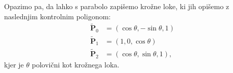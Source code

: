\documentclass[a4paper,11pt]{article}
\theoremstyle{definition}
\theoremstyle{plain}
\begin{document}
\noindent
Opazimo pa, da lahko s parabolo zapišemo krožne loke, ki jih opišemo z naslednjim kontrolnim poligonom:
\begin{align*}
\boldsymbol{\tilde{P}}_0 &= (\cos{\theta}, -\sin{\theta}, 1)\\
\boldsymbol{\tilde{P}}_1 &= (1, 0, \cos{\theta})\\
\boldsymbol{\tilde{P}}_2 &= (\cos \theta, \sin\theta, 1),
\end{align*}
kjer je $\theta$ polovični kot krožnega loka. 

\end{document}
